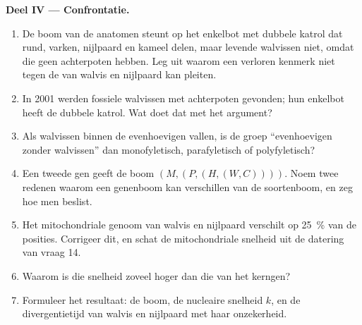 \begin{problem}
\medskip
\noindent\textbf{Deel IV --- Confrontatie.}
\begin{enumerate}[resume]
  \item De boom van de anatomen steunt op het enkelbot met dubbele katrol dat
        rund, varken, nijlpaard en kameel delen, maar levende walvissen niet,
        omdat die geen achterpoten hebben. Leg uit waarom een verloren
        kenmerk niet tegen de  van walvis en nijlpaard kan pleiten.
  \item In 2001 werden fossiele walvissen met achterpoten gevonden; hun
        enkelbot heeft de dubbele katrol. Wat doet dat met het
        argument?
  \item Als walvissen binnen de evenhoevigen vallen, is de groep
        ``evenhoevigen zonder walvissen'' dan monofyletisch,
        parafyletisch of polyfyletisch?
  \item Een tweede gen geeft de boom $(M,(P,(H,(W,C))))$. Noem twee
        redenen waarom een genenboom kan verschillen van de soortenboom, en
        zeg hoe men beslist.
  \item Het mitochondriale genoom van walvis en nijlpaard verschilt op
        \qty{25}{\%} van de posities. Corrigeer dit, en schat de
        mitochondriale snelheid uit de datering van vraag 14.
  \item Waarom is die snelheid zoveel hoger dan die van het kerngen?
  \item Formuleer het resultaat: de boom, de nucleaire snelheid $k$, en de
        divergentietijd van walvis en nijlpaard met haar onzekerheid.
\end{enumerate}
\end{problem}

